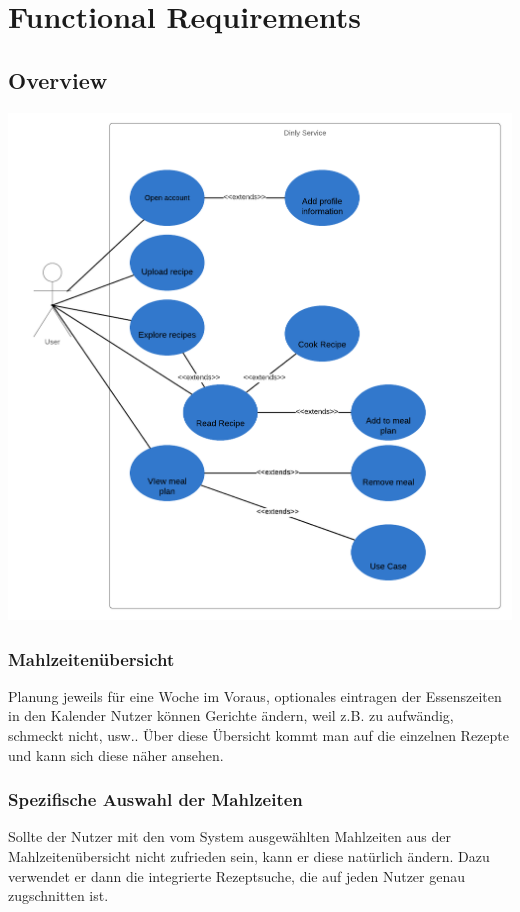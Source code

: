 \documentclass[12pt]{article}
\theoremstyle{definition}
\begin{document}
\section{Functional Requirements}

\subsection{Overview}
\begin{center}
    \includegraphics[width=1.1\textwidth]{res/images/UseCaseDiagram.png}
\end{center}

\subsubsection{Mahlzeitenübersicht}
Planung jeweils für eine Woche im Voraus, optionales eintragen der Essenszeiten in den Kalender
Nutzer können Gerichte ändern, weil z.B. zu aufwändig, schmeckt nicht, usw.. Über diese Übersicht kommt man auf die einzelnen Rezepte und kann sich diese näher ansehen.

\subsubsection{Spezifische Auswahl der Mahlzeiten}
Sollte der Nutzer mit den vom System ausgewählten Mahlzeiten aus der Mahlzeitenübersicht nicht zufrieden sein, kann er diese natürlich ändern.
Dazu verwendet er dann die integrierte Rezeptsuche, die auf jeden Nutzer genau zugschnitten ist.
\end{document}
